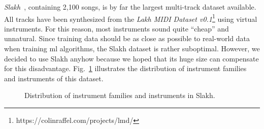 \textit{Slakh}~\cite{manilow2019slakh}, containing 2,100 songs, is by far the largest multi-track dataset available. All tracks have been synthesized from the \textit{Lakh MIDI Dataset v0.1}\footnote{https://colinraffel.com/projects/lmd/} using virtual instruments. For this reason, most instruments sound quite \enquote{cheap} and unnatural. Since training data should be as close as possible to real-world data when training \gls{ml} algorithms, the Slakh dataset is rather suboptimal. However, we decided to use Slakh anyhow because we hoped that its huge size can compensate for this disadvantage. Fig.~\ref{fig:stats-slakh} illustrates the distribution of instrument families and instruments of this dataset.\\
\begin{figure}
	\centering%
	\caption{Distribution of instrument families and instruments in Slakh.}\label{fig:stats-slakh}
\end{figure}

